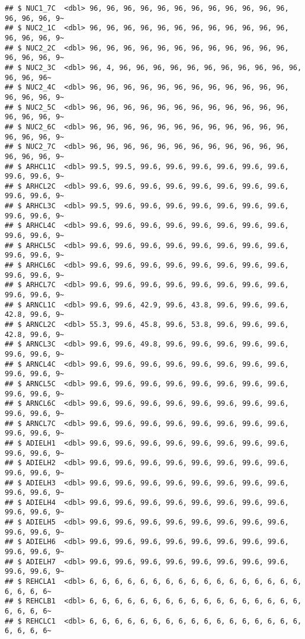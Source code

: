 \documentclass[
]{article}
\begin{document}
\begin{verbatim}
## $ NUC1_7C  <dbl> 96, 96, 96, 96, 96, 96, 96, 96, 96, 96, 96, 96, 96, 96, 96, 9~
## $ NUC2_1C  <dbl> 96, 96, 96, 96, 96, 96, 96, 96, 96, 96, 96, 96, 96, 96, 96, 9~
## $ NUC2_2C  <dbl> 96, 96, 96, 96, 96, 96, 96, 96, 96, 96, 96, 96, 96, 96, 96, 9~
## $ NUC2_3C  <dbl> 96, 4, 96, 96, 96, 96, 96, 96, 96, 96, 96, 96, 96, 96, 96, 96~
## $ NUC2_4C  <dbl> 96, 96, 96, 96, 96, 96, 96, 96, 96, 96, 96, 96, 96, 96, 96, 9~
## $ NUC2_5C  <dbl> 96, 96, 96, 96, 96, 96, 96, 96, 96, 96, 96, 96, 96, 96, 96, 9~
## $ NUC2_6C  <dbl> 96, 96, 96, 96, 96, 96, 96, 96, 96, 96, 96, 96, 96, 96, 96, 9~
## $ NUC2_7C  <dbl> 96, 96, 96, 96, 96, 96, 96, 96, 96, 96, 96, 96, 96, 96, 96, 9~
## $ ARHCL1C  <dbl> 99.5, 99.5, 99.6, 99.6, 99.6, 99.6, 99.6, 99.6, 99.6, 99.6, 9~
## $ ARHCL2C  <dbl> 99.6, 99.6, 99.6, 99.6, 99.6, 99.6, 99.6, 99.6, 99.6, 99.6, 9~
## $ ARHCL3C  <dbl> 99.5, 99.6, 99.6, 99.6, 99.6, 99.6, 99.6, 99.6, 99.6, 99.6, 9~
## $ ARHCL4C  <dbl> 99.6, 99.6, 99.6, 99.6, 99.6, 99.6, 99.6, 99.6, 99.6, 99.6, 9~
## $ ARHCL5C  <dbl> 99.6, 99.6, 99.6, 99.6, 99.6, 99.6, 99.6, 99.6, 99.6, 99.6, 9~
## $ ARHCL6C  <dbl> 99.6, 99.6, 99.6, 99.6, 99.6, 99.6, 99.6, 99.6, 99.6, 99.6, 9~
## $ ARHCL7C  <dbl> 99.6, 99.6, 99.6, 99.6, 99.6, 99.6, 99.6, 99.6, 99.6, 99.6, 9~
## $ ARNCL1C  <dbl> 99.6, 99.6, 42.9, 99.6, 43.8, 99.6, 99.6, 99.6, 42.8, 99.6, 9~
## $ ARNCL2C  <dbl> 55.3, 99.6, 45.8, 99.6, 53.8, 99.6, 99.6, 99.6, 42.8, 99.6, 9~
## $ ARNCL3C  <dbl> 99.6, 99.6, 49.8, 99.6, 99.6, 99.6, 99.6, 99.6, 99.6, 99.6, 9~
## $ ARNCL4C  <dbl> 99.6, 99.6, 99.6, 99.6, 99.6, 99.6, 99.6, 99.6, 99.6, 99.6, 9~
## $ ARNCL5C  <dbl> 99.6, 99.6, 99.6, 99.6, 99.6, 99.6, 99.6, 99.6, 99.6, 99.6, 9~
## $ ARNCL6C  <dbl> 99.6, 99.6, 99.6, 99.6, 99.6, 99.6, 99.6, 99.6, 99.6, 99.6, 9~
## $ ARNCL7C  <dbl> 99.6, 99.6, 99.6, 99.6, 99.6, 99.6, 99.6, 99.6, 99.6, 99.6, 9~
## $ ADIELH1  <dbl> 99.6, 99.6, 99.6, 99.6, 99.6, 99.6, 99.6, 99.6, 99.6, 99.6, 9~
## $ ADIELH2  <dbl> 99.6, 99.6, 99.6, 99.6, 99.6, 99.6, 99.6, 99.6, 99.6, 99.6, 9~
## $ ADIELH3  <dbl> 99.6, 99.6, 99.6, 99.6, 99.6, 99.6, 99.6, 99.6, 99.6, 99.6, 9~
## $ ADIELH4  <dbl> 99.6, 99.6, 99.6, 99.6, 99.6, 99.6, 99.6, 99.6, 99.6, 99.6, 9~
## $ ADIELH5  <dbl> 99.6, 99.6, 99.6, 99.6, 99.6, 99.6, 99.6, 99.6, 99.6, 99.6, 9~
## $ ADIELH6  <dbl> 99.6, 99.6, 99.6, 99.6, 99.6, 99.6, 99.6, 99.6, 99.6, 99.6, 9~
## $ ADIELH7  <dbl> 99.6, 99.6, 99.6, 99.6, 99.6, 99.6, 99.6, 99.6, 99.6, 99.6, 9~
## $ REHCLA1  <dbl> 6, 6, 6, 6, 6, 6, 6, 6, 6, 6, 6, 6, 6, 6, 6, 6, 6, 6, 6, 6, 6~
## $ REHCLB1  <dbl> 6, 6, 6, 6, 6, 6, 6, 6, 6, 6, 6, 6, 6, 6, 6, 6, 6, 6, 6, 6, 6~
## $ REHCLC1  <dbl> 6, 6, 6, 6, 6, 6, 6, 6, 6, 6, 6, 6, 6, 6, 6, 6, 6, 6, 6, 6, 6~

\end{verbatim}
\end{document}
